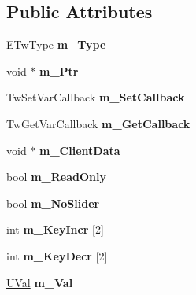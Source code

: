 \subsection*{Public Attributes}
\begin{DoxyCompactItemize}
\item 
\hypertarget{struct_c_tw_var_atom_ae4963a51bb6b17d5ba7f40c33c3f73fa}{E\+Tw\+Type {\bfseries m\+\_\+\+Type}}\label{struct_c_tw_var_atom_ae4963a51bb6b17d5ba7f40c33c3f73fa}

\item 
\hypertarget{struct_c_tw_var_atom_a9deb3154fdde241abb61dfcc913ebcb2}{void $\ast$ {\bfseries m\+\_\+\+Ptr}}\label{struct_c_tw_var_atom_a9deb3154fdde241abb61dfcc913ebcb2}

\item 
\hypertarget{struct_c_tw_var_atom_ac98cd509ce7c55ab19d8608860264fdd}{Tw\+Set\+Var\+Callback {\bfseries m\+\_\+\+Set\+Callback}}\label{struct_c_tw_var_atom_ac98cd509ce7c55ab19d8608860264fdd}

\item 
\hypertarget{struct_c_tw_var_atom_a74bd1d9bac0e3b3aaea3112620acc284}{Tw\+Get\+Var\+Callback {\bfseries m\+\_\+\+Get\+Callback}}\label{struct_c_tw_var_atom_a74bd1d9bac0e3b3aaea3112620acc284}

\item 
\hypertarget{struct_c_tw_var_atom_af7554af2b2040da85d0174b26bacf3e7}{void $\ast$ {\bfseries m\+\_\+\+Client\+Data}}\label{struct_c_tw_var_atom_af7554af2b2040da85d0174b26bacf3e7}

\item 
\hypertarget{struct_c_tw_var_atom_a9a3efd9545ecc9eb72460f51b431104c}{bool {\bfseries m\+\_\+\+Read\+Only}}\label{struct_c_tw_var_atom_a9a3efd9545ecc9eb72460f51b431104c}

\item 
\hypertarget{struct_c_tw_var_atom_a7c3432d8e423b06020799b6775a9266f}{bool {\bfseries m\+\_\+\+No\+Slider}}\label{struct_c_tw_var_atom_a7c3432d8e423b06020799b6775a9266f}

\item 
\hypertarget{struct_c_tw_var_atom_ad71b3ab0fed70fb36883108475165bc1}{int {\bfseries m\+\_\+\+Key\+Incr} \mbox{[}2\mbox{]}}\label{struct_c_tw_var_atom_ad71b3ab0fed70fb36883108475165bc1}

\item 
\hypertarget{struct_c_tw_var_atom_aa942a4ab207bfd06800e2b4d7e8ae9e7}{int {\bfseries m\+\_\+\+Key\+Decr} \mbox{[}2\mbox{]}}\label{struct_c_tw_var_atom_aa942a4ab207bfd06800e2b4d7e8ae9e7}

\item 
\hypertarget{struct_c_tw_var_atom_a6c9ef23d5c66c86b6add4b43ba3af24e}{\hyperlink{union_c_tw_var_atom_1_1_u_val}{U\+Val} {\bfseries m\+\_\+\+Val}}\label{struct_c_tw_var_atom_a6c9ef23d5c66c86b6add4b43ba3af24e}

\end{DoxyCompactItemize}
